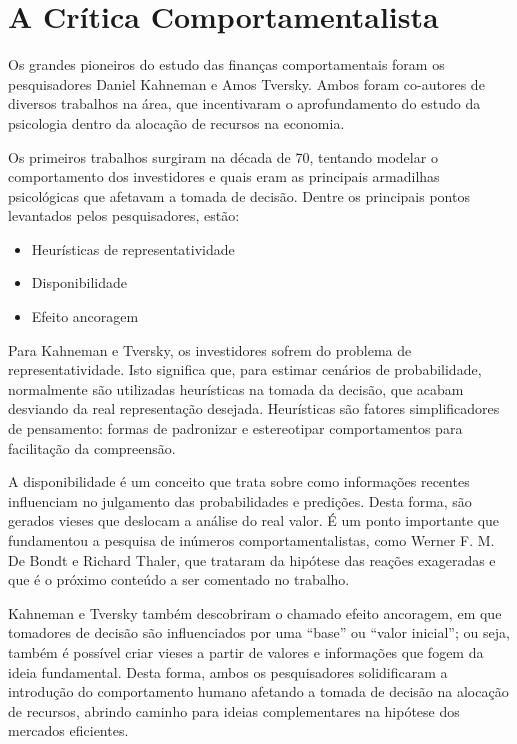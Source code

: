 \chapter{A Crítica Comportamentalista}
\label{cap:comportamental}

Os grandes pioneiros do estudo das finanças comportamentais foram os pesquisadores
Daniel Kahneman e Amos Tversky. Ambos foram co-autores de diversos trabalhos na área, que
incentivaram o aprofundamento do estudo da psicologia dentro da alocação de recursos na
economia.

Os primeiros trabalhos surgiram na década de 70, tentando modelar o comportamento dos investidores e quais eram as principais armadilhas psicológicas que afetavam a tomada de decisão. Dentre os principais pontos levantados pelos pesquisadores, estão:

\begin{itemize}
	\item Heurísticas de representatividade
	\item Disponibilidade
	\item Efeito ancoragem
\end{itemize}
 
Para Kahneman e Tversky, os investidores sofrem do problema de representatividade. Isto significa que, para estimar cenários de probabilidade, normalmente são utilizadas heurísticas na tomada da decisão, que acabam desviando da real representação desejada. Heurísticas são
fatores simplificadores de pensamento: formas de padronizar e estereotipar comportamentos para facilitação da compreensão.

A disponibilidade é um conceito que trata sobre como informações recentes influenciam no julgamento das probabilidades e predições. Desta forma, são gerados vieses que deslocam a análise do real valor. É um ponto importante que fundamentou a pesquisa de inúmeros comportamentalistas, como Werner F. M. De Bondt e Richard Thaler, que trataram da hipótese das reações exageradas e que é o próximo conteúdo a ser comentado no trabalho.

Kahneman e Tversky também descobriram o chamado efeito ancoragem,  em que tomadores de decisão são influenciados por uma “base” ou “valor inicial”; ou seja, também é possível criar vieses a partir de valores e informações que fogem da ideia fundamental. Desta forma, ambos os pesquisadores solidificaram a introdução do comportamento humano afetando a tomada de decisão na alocação de recursos, abrindo caminho para ideias complementares na hipótese dos mercados eficientes.

